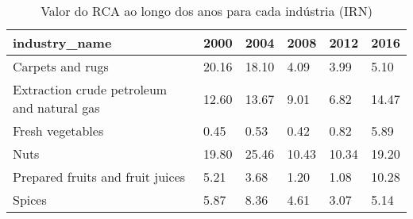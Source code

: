 \begin{table}
\centering
\caption{Valor do RCA ao longo dos anos para cada indústria (IRN)}
\begin{tabular}{p{6cm}p{1.5cm}p{1.5cm}p{1.5cm}p{1.5cm}p{1.5cm}}
\toprule
                             industry\_name &  2000 &  2004 &  2008 &  2012 &  2016 \\
\midrule
                          Carpets and rugs & 20.16 & 18.10 &  4.09 &  3.99 &  5.10 \\
Extraction crude petroleum and natural gas & 12.60 & 13.67 &  9.01 &  6.82 & 14.47 \\
                          Fresh vegetables &  0.45 &  0.53 &  0.42 &  0.82 &  5.89 \\
                                      Nuts & 19.80 & 25.46 & 10.43 & 10.34 & 19.20 \\
          Prepared fruits and fruit juices &  5.21 &  3.68 &  1.20 &  1.08 & 10.28 \\
                                    Spices &  5.87 &  8.36 &  4.61 &  3.07 &  5.14 \\
\bottomrule
\end{tabular}
\end{table}
